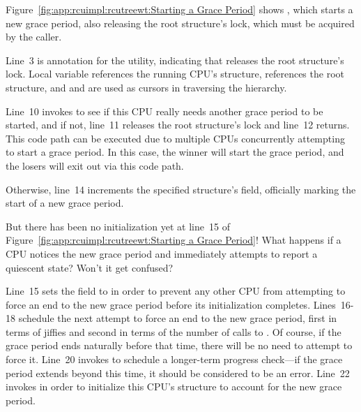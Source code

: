 Figure~\ref{fig:app:rcuimpl:rcutreewt:Starting a Grace Period}
shows , which starts a new grace period,
also releasing the root  structure's lock, which
must be acquired by the caller.

Line~3 is annotation for the  utility, indicating
that  releases the root 
structure's lock.
Local variable  references the running CPU's 
structure,  references the root  structure,
and  and  are used as cursors in traversing
the  hierarchy.

Line~10 invokes  to see if this CPU really
needs another grace period to be started, and if not, line~11
releases the root  structure's lock and line~12 returns.
This code path can be executed due to multiple CPUs concurrently
attempting to start a grace period.
In this case, the winner will start the grace period, and the losers
will exit out via this code path.

Otherwise, line~14 increments the specified  structure's
 field, officially marking the start of a new grace
period.

\QuickQuiz{}
	But there has been no initialization yet at line~15 of
	Figure~\ref{fig:app:rcuimpl:rcutreewt:Starting a Grace Period}!
	What happens if a CPU notices the new grace period and
	immediately attempts to report a quiescent state?
	Won't it get confused?
 \QuickQuizEnd

Line~15 sets the  field to  in order
to prevent any other CPU from attempting to force an end to the new
grace period before its initialization completes.
Lines~16-18 schedule the next attempt to force an end to the new
grace period, first in terms of jiffies and second in terms of the
number of calls to .
Of course, if the grace period ends naturally before that time,
there will be no need to attempt to force it.
Line~20 invokes  to schedule a
longer-term progress check---if the grace period extends beyond this
time, it should be considered to be an error.
Line~22 invokes  in order to initialize this
CPU's  structure to account for the new grace period.


